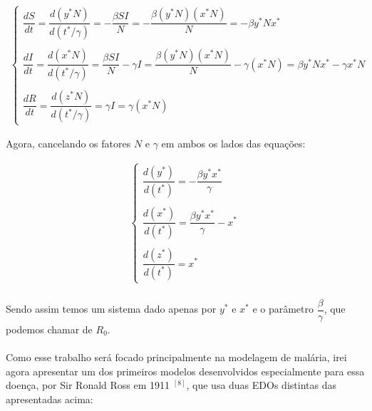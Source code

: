 \documentclass[12pt]{article}
\begin{document}
\begin{gather*}
\begin{cases}
\dfrac{dS}{dt} = \dfrac{d(y^*N)}{d(t^*/\gamma)} = -\dfrac{\beta SI}{N} = -\dfrac{\beta(y^*N)(x^*N)}{N} = -\beta y^*Nx^* \\
\\
\dfrac{dI}{dt} = \dfrac{d(x^*N)}{d(t^*/\gamma)} = \dfrac{\beta SI}{N} - \gamma I = \dfrac{\beta(y^*N)(x^*N)}{N} -\gamma(x^*N) = \beta y^*Nx^* - \gamma x^*N \\
\\
\dfrac{dR}{dt} = \dfrac{d(z^*N)}{d(t^*/\gamma)} = \gamma I = \gamma(x^*N)
\end{cases}
\end{gather*}

Agora, cancelando os fatores $N$ e $\gamma$ em ambos os lados das equações:

\begin{gather*}
\begin{cases}
\dfrac{d(y^*)}{d(t^*)} = -\dfrac{\beta y^*x^*}{\gamma} \\
\\
\dfrac{d(x^*)}{d(t^*)} = \dfrac{\beta y^*x^*}{\gamma} - x^* \\
\\
\dfrac{d(z^*)}{d(t^*)} = x^*
\end{cases}
\end{gather*}
\\
Sendo assim temos um sistema dado apenas por $y^*$ e $x^*$ e o parâmetro 
$\dfrac{\beta}{\gamma}$, que podemos chamar de $R_0$.
\\\\
Como esse trabalho será focado principalmente na modelagem de malária, 
irei agora apresentar um dos primeiros modelos desenvolvidos especialmente 
para essa doença, por Sir Ronald Ross em 1911 $^{[8]}$, que usa duas EDOs 
distintas das apresentadas acima:
\end{document}
